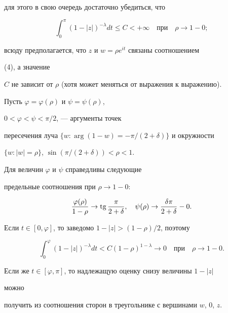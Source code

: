 для этого в свою очередь достаточно убедиться, что 


\begin{equation} 


\int^\pi_0(1-|z|)^{-\lambda}d t\le C<+\infty\quad 


\text{при}\quad \rho\to1-0; 


\end{equation} 


всюду предполагается, что $z$ и $w=\rho e^{it}$ связаны соотношением 


(4), а значение 


$C$ не зависит от $\rho$ (хотя может меняться от выражения к выражению). 


 


Пусть $\varphi=\varphi(\rho)$ и $\psi=\psi(\rho)$, 


$0<\varphi<\psi<\pi/2$, --- аргументы точек 


пересечения луча $\{w:\arg(1-w)=-\pi/(2+\delta)\}$ и окружности 


$\{w:|w|=\rho\}$, $\sin(\pi/(2+\delta))<\rho<1$. 


Для величин $\varphi$ и $\psi$ справедливы следующие 


предельные соотношения при $\rho\to1-0$: 


\begin{equation} 


\frac{\varphi(\rho)}{1-\rho}\to\tg\frac{\pi}{2+\delta},\quad 


\psi(\rho)\to\frac{\delta\pi}{2+\delta}-0. 


\end{equation} 


 


Если $t\in[0,\varphi]$, то заведомо $1-|z|>(1-\rho)/2$, поэтому 


\begin{equation} 


\int^\varphi_0(1-|z|)^{-\lambda}d t<C(1-\rho)^{1-\lambda} 


\to 0\quad 


\text{при} \quad\rho\to1-0. 


\end{equation} 


Если же $t\in[\varphi,\pi]$, то надлежащую оценку снизу величины $1-|z|$ 


можно 


получить из соотношения сторон в треугольнике с вершинами $w$, $0$, $z$. 


